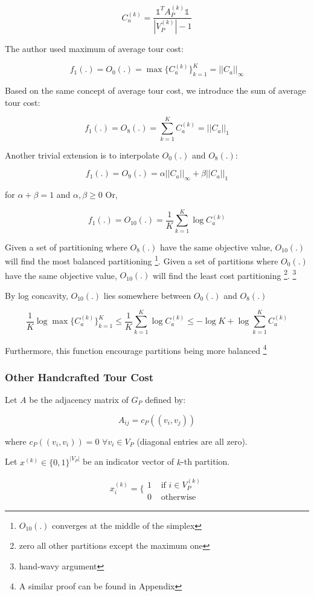 \[
C_a^{(k)} = \frac{\mathds{1}^T A_P^{(k)} \mathds{1}}{|V_P^{(k)}| - 1}
\]

The author used maximum of average tour cost:

\[
f_1(.) = O_0(.) = \max\{C_a^{(k)}\}_{k=1}^{K} = ||C_a||_\infty
\]

Based on the same concept of average tour cost, we introduce the sum of average tour cost:

\[
f_1(.) = O_8(.) = \sum_{k=1}^{K} C_a^{(k)} = ||C_a||_1
\]

Another trivial extension is to interpolate $O_0(.)$ and $O_8(.)$:

\[
f_1(.) = O_9(.) = \alpha ||C_a||_\infty + \beta ||C_a||_1
\]

for $\alpha + \beta = 1$ and $\alpha, \beta \geq 0$
Or, 

\[
f_1(.) = O_{10}(.) = \frac{1}{K}\sum_{k=1}^{K}\log C_a^{(k)}
\]

Given a set of partitioning where $O_8(.)$ have the same objective value, $O_{10}(.)$ will find the most balanced partitioning \footnote{$O_{10}(.)$ converges at the middle of the simplex}. Given a set of partitions where $O_0(.)$ have the same objective value, $O_{10}(.)$ will find the least cost partitioning \footnote{zero all other partitions except the maximum one}. \footnote{hand-wavy argument}

By log concavity, $O_{10}(.)$ lies somewhere between $O_0(.)$ and $O_8(.)$

\[
\frac{1}{K} \log \max \{C_a^{(k)}\}_{k=1}^{K} \leq \frac{1}{K}\sum_{k=1}^{K}\log C_a^{(k)} \leq - \log K + \log \sum_{k=1}^{K} C_a^{(k)}
\]

Furthermore, this function encourage partitions being more balanced \footnote{A similar proof can be found in Appendix}


\subsubsection{Other Handcrafted Tour Cost}

Let $A$ be the adjacency matrix of $G_P$ defined by:

\[
A_{ij} = c_P((v_i, v_j))
\]

where $c_P((v_i, v_i)) = 0$ $\forall v_i \in V_P$ (diagonal entries are all zero).

Let $x^{(k)} \in \{0, 1\}^{|V_P|}$ be an indicator vector of $k$-th partition.

\[
x^{(k)}_i = \{
        \begin{array}{ll}
            1 \;\;\;\; \text{if $i \in V_P^{(k)}$}\\
            0 \;\;\;\; \text{otherwise}
        \end{array}
\]


